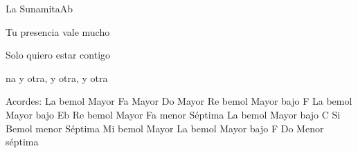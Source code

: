 \documentclass[12pt, spanish]{book}
\begin{document}
\begin{song}{La Sunamita}{Ab}
\begin{SBOpGroup}
            Tu presencia vale mucho 

            Solo quiero estar contigo

            na y otra, y otra, y otra 
        \end{SBOpGroup}

        \ifChordBk
        \begin{SBOpGroup}
            Acordes:
            \upchord{\Aflat}\qquad La bemol Mayor \hfill
            \upchord{\F}\qquad Fa Mayor \hfill\null\break
            \upchord{\C}\qquad Do Mayor \hfill
            \upchord{\DflatF}\qquad Re bemol Mayor bajo F  \hfill\null\break
            \upchord{\AflatEflat}\qquad La bemol Mayor bajo Eb \hfill\null\break
            \upchord{\Dflat}\qquad Re bemol Mayor  \hfill
            \upchord{\Fmseven}\quad Fa menor S\'eptima \hfill\null\break
            \upchord{\AflatC}\qquad La bemol Mayor bajo C \hfill
            \upchord{\Bflatmseven}Si Bemol menor S\'eptima \hfill\null\break
            \upchord{\Eflat}\qquad Mi bemol Mayor \hfill
            \upchord{\AflatF}\qquad La bemol Mayor bajo F \hfill\null\break
            \upchord{\Cmseven}\qquad Do Menor s\'eptima \hfill\null\break
        \end{SBOpGroup}
        \fi
    \end{song}
\end{document}

